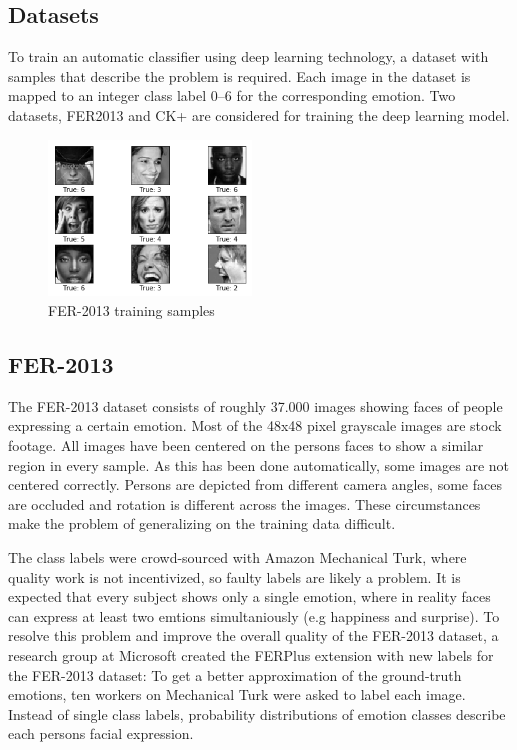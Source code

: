 \documentclass[twoside]{article}
\begin{document}
\begin{multicols}{2}
\section{Datasets}
To train an automatic classifier using deep learning technology, a dataset with samples that describe the problem is required. Each image in the dataset is mapped to an integer class label 0–6 for the corresponding emotion. Two datasets, FER2013 \cite{goodfel13} and CK+ \cite{cohn00} are considered for training the deep learning model.

\begin{figure}[H]
	\includegraphics[width=0.48\textwidth]{fer_examples}
	\caption{FER-2013 training samples}
\end{figure}


\subsection{FER-2013}
The FER-2013 dataset consists of roughly 37.000 images showing faces of people expressing a certain emotion. Most of the 48x48 pixel grayscale images are stock footage. All images have been centered on the persons faces to show a similar region in every sample. As this has been done automatically, some images are not centered correctly. Persons are depicted from different camera angles, some faces are occluded and rotation is different across the images. These circumstances make the problem of generalizing on the training data difficult. 

The class labels were crowd-sourced with Amazon Mechanical Turk, where quality work is not incentivized, so faulty labels are likely a problem. It is expected that every subject shows only a single emotion, where in reality faces can express at least two emtions simultaniously (e.g happiness and surprise). To resolve this problem and improve the overall quality of the FER-2013 dataset, a research group at Microsoft created the FERPlus extension \cite{barsoum16} with new labels for the FER-2013 dataset: To get a better approximation of the ground-truth emotions, ten workers on Mechanical Turk were asked to label each image. Instead of single class labels, probability distributions of emotion classes describe each persons facial expression. 


\end{multicols}
\end{document}
